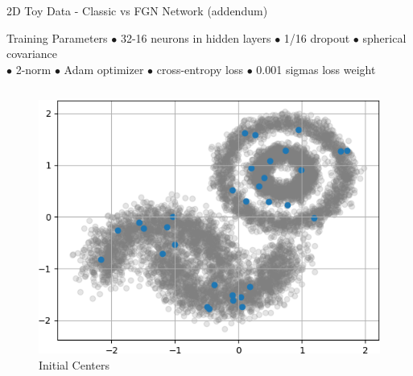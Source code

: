 \documentclass{beamer}
\begin{document}
\begin{frame}{2D Toy Data - Classic vs FGN Network (addendum)}
    
    \begin{block}{Training Parameters}
    $\bullet$ 32-16 neurons in hidden layers $\bullet$ 1/16 dropout $\bullet$ spherical covariance\\
    $\bullet$ 2-norm $\bullet$ Adam optimizer $\bullet$ cross-entropy loss $\bullet$ 0.001 sigmas loss weight
    \end{block}

    \begin{columns}
    \begin{column}{.333\textwidth}
    \begin{figure}
        \centering
        \includegraphics[width=1.\textwidth]{images/2D-network-toy/centers-init.png}
        \caption*{Initial Centers}
    \end{figure}
    \end{column}
    

\end{columns}
\end{frame}
\end{document}
